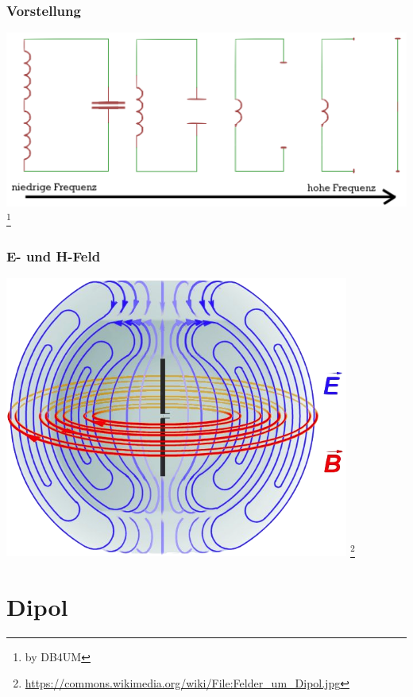 \begin{frame}
    \frametitle{Vorstellung}
    \begin{center}
        \includegraphics[width=1\textwidth]{e11/dipol_entstehung.png}
        \footnote{\tiny by DB4UM}
	\end{center}
\end{frame}

\begin{frame}
    \frametitle{E- und H-Feld}
    \begin{center}
        \includegraphics[width=0.85\textwidth]{e11/Felder_um_Dipol.png}
        \footnote{\tiny \url{https://commons.wikimedia.org/wiki/File:Felder_um_Dipol.jpg}}
	\end{center}
\end{frame}


\section*{Dipol}

